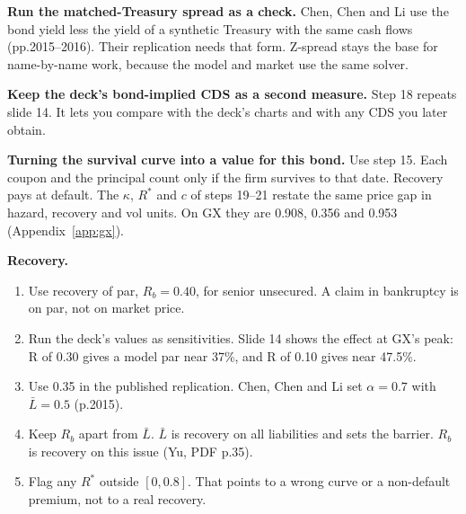 \documentclass[10pt,a4paper]{article}
\newcommand{\Lbar}{\bar{L}}
\begin{document}
\textbf{Run the matched-Treasury spread as a check.} Chen, Chen and Li use the bond yield less the yield of a synthetic Treasury with the same cash flows (pp.2015--2016). Their replication needs that form. Z-spread stays the base for name-by-name work, because the model and market use the same solver.

\textbf{Keep the deck's bond-implied CDS as a second measure.} Step 18 repeats slide 14. It lets you compare with the deck's charts and with any CDS you later obtain.

\textbf{Turning the survival curve into a value for this bond.} Use step 15. Each coupon and the principal count only if the firm survives to that date. Recovery pays at default. The $\kappa$, $R^*$ and $c$ of steps 19--21 restate the same price gap in hazard, recovery and vol units. On GX they are 0.908, 0.356 and 0.953 (Appendix~\ref{app:gx}).

\textbf{Recovery.}
\begin{enumerate}[nosep]
\item Use recovery of par, $R_b=0.40$, for senior unsecured. A claim in bankruptcy is on par, not on market price.
\item Run the deck's values as sensitivities. Slide 14 shows the effect at GX's peak: R of 0.30 gives a model par near 37\%, and R of 0.10 gives near 47.5\%.
\item Use 0.35 in the published replication. Chen, Chen and Li set $\alpha=0.7$ with $\Lbar=0.5$ (p.2015).
\item Keep $R_b$ apart from $\Lbar$. $\Lbar$ is recovery on all liabilities and sets the barrier. $R_b$ is recovery on this issue (Yu, PDF p.35).
\item Flag any $R^*$ outside $[0,0.8]$. That points to a wrong curve or a non-default premium, not to a real recovery.
\end{enumerate}
\end{document}
